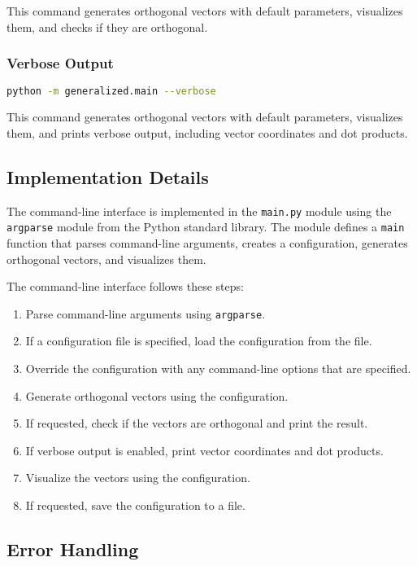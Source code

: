 This command generates orthogonal vectors with default parameters, visualizes them, and checks if they are orthogonal.

\subsubsection{Verbose Output}

\begin{lstlisting}[language=bash]
python -m generalized.main --verbose
\end{lstlisting}

This command generates orthogonal vectors with default parameters, visualizes them, and prints verbose output, including vector coordinates and dot products.

\subsection{Implementation Details}

The command-line interface is implemented in the \texttt{main.py} module using the \texttt{argparse} module from the Python standard library. The module defines a \texttt{main} function that parses command-line arguments, creates a configuration, generates orthogonal vectors, and visualizes them.

The command-line interface follows these steps:

\begin{enumerate}
    \item Parse command-line arguments using \texttt{argparse}.
    \item If a configuration file is specified, load the configuration from the file.
    \item Override the configuration with any command-line options that are specified.
    \item Generate orthogonal vectors using the configuration.
    \item If requested, check if the vectors are orthogonal and print the result.
    \item If verbose output is enabled, print vector coordinates and dot products.
    \item Visualize the vectors using the configuration.
    \item If requested, save the configuration to a file.
\end{enumerate}

\subsection{Error Handling}

